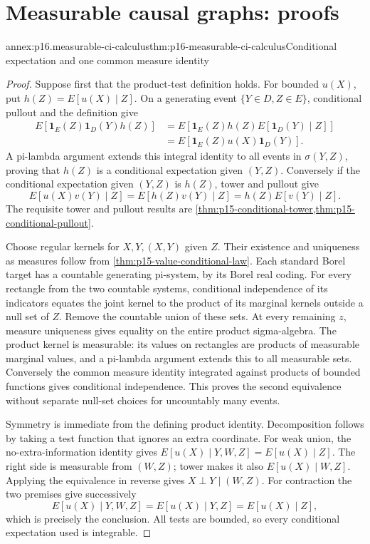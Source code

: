 \section{Measurable causal graphs: proofs}
\label{sec:annex-p16-measurable-causal-graphs}

\begin{annexitem}{annex:p16.measurable-ci-calculus}{thm:p16-measurable-ci-calculus}{Conditional expectation and one common measure identity}
\begin{proof}
Suppose first that the product-test definition holds. For bounded
\(u(X)\), put \(h(Z)=E[u(X)\mid Z]\). On a generating event
\(\{Y\in D,Z\in E\}\), conditional pullout and the definition give
\[
\begin{aligned}
 E[\mathbf1_E(Z)\mathbf1_D(Y)h(Z)]
 &=E[\mathbf1_E(Z)h(Z)E[\mathbf1_D(Y)\mid Z]]\\
 &=E[\mathbf1_E(Z)u(X)\mathbf1_D(Y)].
\end{aligned}
\]
A pi-lambda argument extends this integral identity to all events in
\(\sigma(Y,Z)\), proving that \(h(Z)\) is a conditional expectation
given \((Y,Z)\). Conversely if the conditional expectation given
\((Y,Z)\) is \(h(Z)\), tower and pullout give
\[
 E[u(X)v(Y)\mid Z]
 =E[h(Z)v(Y)\mid Z]=h(Z)E[v(Y)\mid Z].
\]
The requisite tower and pullout results are
\cref{thm:p15-conditional-tower,thm:p15-conditional-pullout}.

Choose regular kernels for \(X,Y,(X,Y)\) given \(Z\). Their existence
and uniqueness as measures follow from
\cref{thm:p15-value-conditional-law}. Each standard Borel target has
a countable generating pi-system, by its Borel real coding. For every
rectangle from the two countable systems, conditional independence of
its indicators equates the joint kernel to the product of its marginal
kernels outside a null set of \(Z\). Remove the countable union of these
sets. At every remaining \(z\), measure uniqueness gives equality on
the entire product sigma-algebra. The product kernel is measurable:
its values on rectangles are products of measurable marginal values,
and a pi-lambda argument extends this to all measurable sets. Conversely
the common measure identity integrated against products of bounded
functions gives conditional independence. This proves the second
equivalence without separate null-set choices for uncountably many events.

Symmetry is immediate from the defining product identity. Decomposition
follows by taking a test function that ignores an extra coordinate.
For weak union, the no-extra-information identity gives
\(E[u(X)\mid Y,W,Z]=E[u(X)\mid Z]\). The right side is measurable
from \((W,Z)\); tower makes it also \(E[u(X)\mid W,Z]\).
Applying the equivalence in reverse gives \(X\perp Y\mid(W,Z)\).
For contraction the two premises give successively
\[
 E[u(X)\mid Y,W,Z]=E[u(X)\mid Y,Z]=E[u(X)\mid Z],
\]
which is precisely the conclusion. All tests are bounded, so every
conditional expectation used is integrable.


\end{proof}
\end{annexitem}

